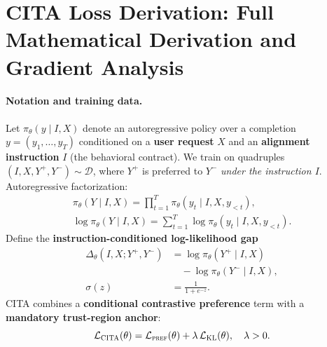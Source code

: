 
\section{CITA Loss Derivation: Full Mathematical Derivation and Gradient Analysis}
\label{sec:appendix_cita_kl}

\vspace{-0.35em}
\paragraph{Notation and training data.}
Let $\pi_\theta(y\mid I,X)$ denote an autoregressive policy over a completion
$y=(y_1,\ldots,y_T)$ conditioned on a \textbf{user request} $X$ and an \textbf{alignment instruction} $I$
(the behavioral contract). We train on quadruples $(I,X,Y^+,Y^-)\sim\mathcal{D}$, where $Y^+$ is preferred to $Y^-$ \emph{under the instruction $I$}.
Autoregressive factorization:
\begin{gather*}
\pi_\theta(Y\mid I,X)
=
\prod_{t=1}^{T}\pi_\theta(y_t\mid I,X,y_{<t}),\\
\log \pi_\theta(Y\mid I,X)
=
\sum_{t=1}^{T}\log \pi_\theta(y_t\mid I,X,y_{<t}).
\end{gather*}
Define the \textbf{instruction-conditioned log-likelihood gap}
{\footnotesize
\begin{align*}
\Delta_\theta(I,X;Y^+,Y^-)
&=
\log \pi_\theta(Y^+\mid I,X)\\
&\quad -\log \pi_\theta(Y^-\mid I,X),\\
\sigma(z)&=\tfrac{1}{1+e^{-z}}.
\end{align*}
}
CITA combines a \textbf{conditional contrastive preference} term with a \textbf{mandatory trust-region anchor}:
\[
\mathcal{L}_{\textsc{CITA}}(\theta)
=
\mathcal{L}_{\textsc{pref}}(\theta)
+
\lambda\,\mathcal{L}_{\textsc{KL}}(\theta),
\quad
\lambda>0.
\]

\vspace{-0.35em}
